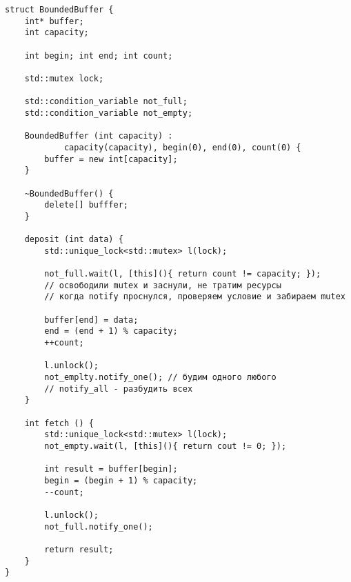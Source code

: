\begin{verbatim}
struct BoundedBuffer {
	int* buffer;
	int capacity;

	int begin; int end; int count;

	std::mutex lock;

	std::condition_variable not_full;
	std::condition_variable not_empty;

	BoundedBuffer (int capacity) : 
			capacity(capacity), begin(0), end(0), count(0) {
		buffer = new int[capacity];
	}

	~BoundedBuffer() {
	    delete[] bufffer;
	}

	deposit (int data) {
		std::unique_lock<std::mutex> l(lock);

		not_full.wait(l, [this](){ return count != capacity; });
		// освободили mutex и заснули, не тратим ресурсы
		// когда notify проснулся, проверяем условие и забираем mutex
		
		buffer[end] = data;
		end = (end + 1) % capacity;
		++count;

		l.unlock();
		not_emplty.notify_one(); // будим одного любого
		// notify_all - разбудить всех
	}

	int fetch () {
		std::unique_lock<std::mutex> l(lock);
		not_empty.wait(l, [this](){ return cout != 0; }); 

		int result = buffer[begin];
		begin = (begin + 1) % capacity;
		--count;

		l.unlock();
		not_full.notify_one();

		return result;
	}
}
\end{verbatim}


